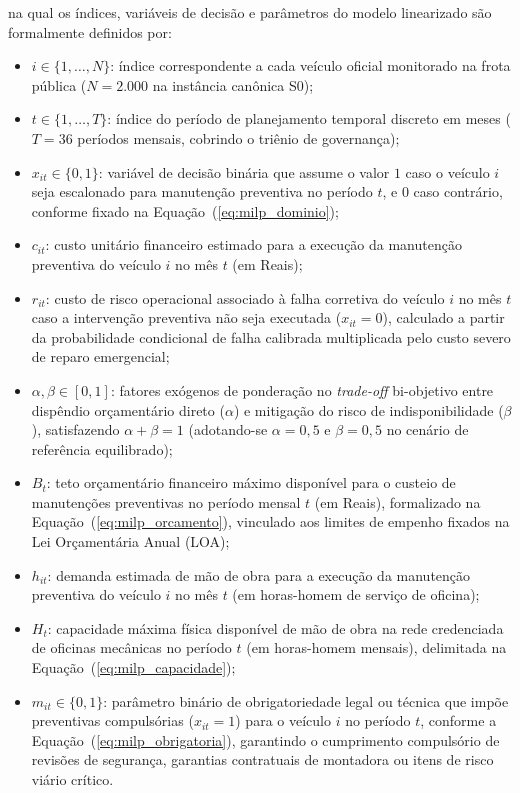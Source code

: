 \noindent na qual os índices, variáveis de decisão e parâmetros do modelo linearizado são formalmente definidos por:
\begin{itemize}
    \item $i \in \{1, \dots, N\}$: índice correspondente a cada veículo oficial monitorado na frota pública ($N = 2.000$ na instância canônica S0);
    \item $t \in \{1, \dots, T\}$: índice do período de planejamento temporal discreto em meses ($T = 36$ períodos mensais, cobrindo o triênio de governança);
    \item $x_{it} \in \{0, 1\}$: variável de decisão binária que assume o valor $1$ caso o veículo $i$ seja escalonado para manutenção preventiva no período $t$, e $0$ caso contrário, conforme fixado na Equação~(\ref{eq:milp_dominio});
    \item $c_{it}$: custo unitário financeiro estimado para a execução da manutenção preventiva do veículo $i$ no mês $t$ (em Reais);
    \item $r_{it}$: custo de risco operacional associado à falha corretiva do veículo $i$ no mês $t$ caso a intervenção preventiva não seja executada ($x_{it} = 0$), calculado a partir da probabilidade condicional de falha calibrada multiplicada pelo custo severo de reparo emergencial;
    \item $\alpha, \beta \in [0, 1]$: fatores exógenos de ponderação no \textit{trade-off} bi-objetivo entre dispêndio orçamentário direto ($\alpha$) e mitigação do risco de indisponibilidade ($\beta$), satisfazendo $\alpha + \beta = 1$ (adotando-se $\alpha = 0,5$ e $\beta = 0,5$ no cenário de referência equilibrado);
    \item $B_t$: teto orçamentário financeiro máximo disponível para o custeio de manutenções preventivas no período mensal $t$ (em Reais), formalizado na Equação~(\ref{eq:milp_orcamento}), vinculado aos limites de empenho fixados na Lei Orçamentária Anual (LOA);
    \item $h_{it}$: demanda estimada de mão de obra para a execução da manutenção preventiva do veículo $i$ no mês $t$ (em horas-homem de serviço de oficina);
    \item $H_t$: capacidade máxima física disponível de mão de obra na rede credenciada de oficinas mecânicas no período $t$ (em horas-homem mensais), delimitada na Equação~(\ref{eq:milp_capacidade});
    \item $m_{it} \in \{0, 1\}$: parâmetro binário de obrigatoriedade legal ou técnica que impõe preventivas compulsórias ($x_{it} = 1$) para o veículo $i$ no período $t$, conforme a Equação~(\ref{eq:milp_obrigatoria}), garantindo o cumprimento compulsório de revisões de segurança, garantias contratuais de montadora ou itens de risco viário crítico.
\end{itemize}

